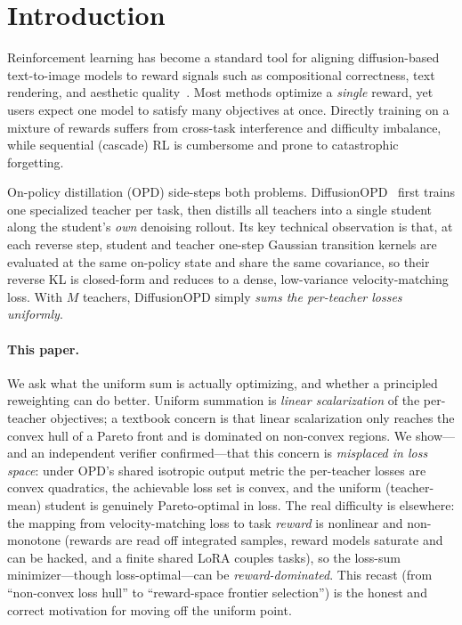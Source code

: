 \section{Introduction}
\label{sec:intro}

Reinforcement learning has become a standard tool for aligning diffusion-based
text-to-image models to reward signals such as compositional correctness, text
rendering, and aesthetic quality~\cite{schulman2017proximal,liu2025flow,zheng2025diffusionnft}.
Most methods optimize a \emph{single} reward, yet users expect one model to
satisfy many objectives at once. Directly training on a mixture of rewards
suffers from cross-task interference and difficulty imbalance, while sequential
(cascade) RL is cumbersome and prone to catastrophic forgetting.

On-policy distillation (OPD) side-steps both problems. DiffusionOPD~\cite{li2026diffusionopd}
first trains one specialized teacher per task, then distills all teachers into a
single student along the student's \emph{own} denoising rollout. Its key technical
observation is that, at each reverse step, student and teacher one-step Gaussian
transition kernels are evaluated at the same on-policy state and share the same
covariance, so their reverse KL is closed-form and reduces to a dense,
low-variance velocity-matching loss. With $M$ teachers, DiffusionOPD simply
\emph{sums the per-teacher losses uniformly}.

\paragraph{This paper.}
We ask what the uniform sum is actually optimizing, and whether a principled
reweighting can do better. Uniform summation is \emph{linear scalarization} of
the per-teacher objectives; a textbook concern is that linear scalarization only
reaches the convex hull of a Pareto front and is dominated on non-convex regions.
We show---and an independent verifier confirmed---that this concern is
\emph{misplaced in loss space}: under OPD's shared isotropic output metric the
per-teacher losses are convex quadratics, the achievable loss set is convex, and
the uniform (teacher-mean) student is genuinely Pareto-optimal in loss. The real
difficulty is elsewhere: the mapping from velocity-matching loss to task
\emph{reward} is nonlinear and non-monotone (rewards are read off integrated
samples, reward models saturate and can be hacked, and a finite shared LoRA
couples tasks), so the loss-sum minimizer---though loss-optimal---can be
\emph{reward-dominated}. This recast (from ``non-convex loss hull'' to
``reward-space frontier selection'') is the honest and correct motivation for
moving off the uniform point.

